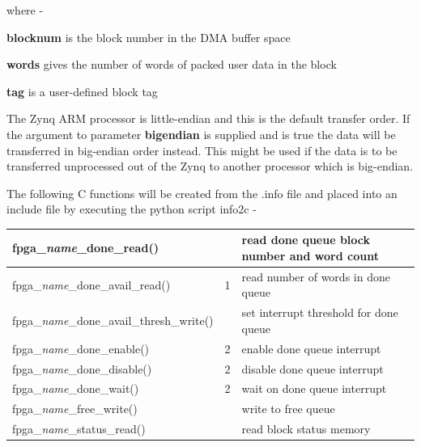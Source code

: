             where -
            \blist
            \item {\bf blocknum} is the block number in the DMA buffer space\\
            \item {\bf words} gives the number of words of packed user data in the block\\
            \item {\bf tag} is a user-defined block tag\\
            \blend
            
            The Zynq ARM processor is little-endian and this is the default transfer
            order. If the argument to parameter {\bf bigendian} is supplied and is
            true the data will be transferred in big-endian order instead. This
            might be used if the data is to be transferred unprocessed out of the
            Zynq to another processor which is big-endian.



            
            
            The following C functions will be created from the .info file and placed
            into an include file by executing the python script info2c -
            
            \begin{tabular}{| l | l | l |}
            \hline
            fpga\_{\em name}\_done\_read()                  &   & read done queue block number and word count\\ \hline
            fpga\_{\em name}\_done\_avail\_read()           & 1 & read number of words in done queue     \\ \hline
            fpga\_{\em name}\_done\_avail\_thresh\_write()  &   & set interrupt threshold for done queue \\ \hline
            fpga\_{\em name}\_done\_enable()                & 2 & enable done queue interrupt            \\ \hline
            fpga\_{\em name}\_done\_disable()               & 2 & disable done queue interrupt           \\ \hline 
            fpga\_{\em name}\_done\_wait()                  & 2 & wait on done queue interrupt           \\ \hline  
            fpga\_{\em name}\_free\_write()                 &   & write to free queue                    \\ \hline  
            fpga\_{\em name}\_status\_read()                &   & read block status memory              \\ \hline  
            \end{tabular}
            
